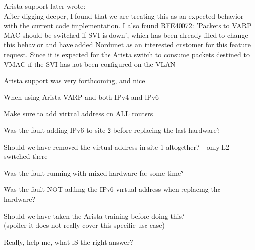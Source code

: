 \documentclass[18pt,landscape,a4paper,footrule]{foils}
\begin{document}

Arista support later wrote:\\
After digging deeper, I found that we are treating this as an expected behavior with the current code implementation. I also found RFE40072: 'Packets to VARP MAC should be switched if SVI is down', which has been already filed to change this behavior and have added Nordunet as an interested customer for this feature request. Since it is expected for the Arista switch to consume packets destined to VMAC if the SVI has not been configured on the VLAN

\vskip 1cm
\centerline{Arista support was very forthcoming, and nice}


\begin{list2}
\item When using Arista VARP and both IPv4 and IPv6
\item Make sure to add virtual address on ALL routers
\item Was the fault adding IPv6 to site 2 before replacing the last hardware?
\item Should we have removed the virtual address in site 1 altogether? - only L2 switched there
\item Was the fault running with mixed hardware for some time?
\item Was the fault NOT adding the IPv6 virtual address when replacing the hardware?
\item Should we have taken the Arista training before doing this? \\
(spoiler it does not really cover this specific use-case)
\end{list2}

Really, help me, what IS the right answer? \smiley
\end{document}
